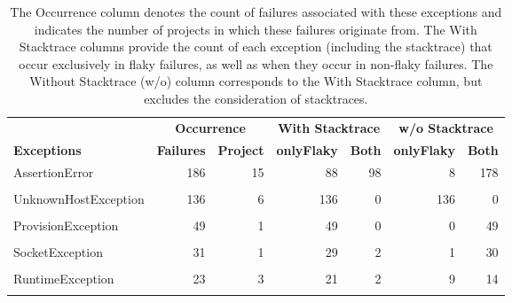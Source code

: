 \begin{table}[t]
  \setlength{\tabcolsep}{2.5pt}


\caption[List of top 10 Exceptions in flaky failures.]{
\textnormal{The Occurrence column denotes the count of failures associated with these exceptions and indicates the number of projects in which these failures originate from.
The With Stacktrace columns provide the count of each exception (including the stacktrace) that occur exclusively in flaky failures, as well as when they occur in non-flaky failures.
The Without Stacktrace (w/o) column corresponds to the With Stacktrace column, but excludes the consideration of stacktraces.}}
\label{table:exceptions}
\centering
\vspace{-4pt}
\footnotesize
\begin{tabular}{l|rr|rr|rr}

\toprule
      & \multicolumn{2}{c|}{\textbf{Occurrence}} & \multicolumn{2}{c|}{\textbf{With Stacktrace}} & \multicolumn{2}{c}{\textbf{w/o Stacktrace}}\\
      

\textbf{Exceptions} & \textbf{Failures} & \textbf{Project}  & \textbf{onlyFlaky} & \textbf{Both}  & \textbf{onlyFlaky} & \textbf{Both} \\
\midrule
AssertionError&186&15&88&98&8&178\\
\cellcolor{gray!6}{NullPointerException}&\cellcolor{gray!6}{185}&\cellcolor{gray!6}{5}&\cellcolor{gray!6}{39}&\cellcolor{gray!6}{146}&\cellcolor{gray!6}{9}&\cellcolor{gray!6}{176}\\
UnknownHostException&136&6&136&0&136&0\\
\cellcolor{gray!6}{IOException}&\cellcolor{gray!6}{70}&\cellcolor{gray!6}{4}&\cellcolor{gray!6}{57}&\cellcolor{gray!6}{13}&\cellcolor{gray!6}{36}&\cellcolor{gray!6}{34}\\
ProvisionException&49&1&49&0&0&49\\
\cellcolor{gray!6}{HCassandraInternalException}&\cellcolor{gray!6}{31}&\cellcolor{gray!6}{1}&\cellcolor{gray!6}{31}&\cellcolor{gray!6}{0}&\cellcolor{gray!6}{31}&\cellcolor{gray!6}{0}\\
SocketException&31&1&29&2&1&30\\
\cellcolor{gray!6}{Exception}&\cellcolor{gray!6}{30}&\cellcolor{gray!6}{5}&\cellcolor{gray!6}{30}&\cellcolor{gray!6}{0}&\cellcolor{gray!6}{28}&\cellcolor{gray!6}{2}\\
RuntimeException&23&3&21&2&9&14\\
\cellcolor{gray!6}{AssertionFailedError}&\cellcolor{gray!6}{22}&\cellcolor{gray!6}{5}&\cellcolor{gray!6}{1}&\cellcolor{gray!6}{21}&\cellcolor{gray!6}{1}&\cellcolor{gray!6}{21}\\


\bottomrule
\end{tabular}
\vspace{-10pt}
\end{table}

